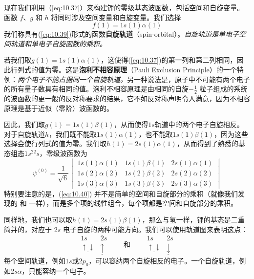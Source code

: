     现在我们利用（\ref{eq:10.37}）来构建锂的零级基态波函数，包括空间和自旋变量。函数 $f$、$g$ 和 $h$ 将同时涉及空间变量和自旋变量。我们选择
    \begin{equation}
        f\left(1\right) = 1s\left(1\right)\alpha\left(1\right)
        \label{eq:10.39}
    \end{equation}
    我们称具有(\ref{eq:10.39})形式的函数\textbf{自旋轨道}（spin-orbital）。\textit{自旋轨道是单电子空间轨道和单电子自旋函数的乘积。}

    若我们取$g\left(1\right) = 1s\left(1\right)\alpha\left(1\right)$，这使得(\ref{eq:10.37})的第一列和第二列相同，因此行列式的值为零。这是\textbf{泡利不相容原理}（Pauli Exclusion Principle）的一个特例：\textit{两个电子不能占据同一个自旋轨道。}另一种说法是，原子中不可能有两个电子的所有量子数具有相同的值。泡利不相容原理是由相同的自旋$-\frac{1}{2}$ 粒子组成的系统的波函数的更一般的反对称要求的结果，它不如反对称声明令人满意，因为不相容原理是基于近似（零阶）波函数的。

    因此，我们取$g\left(1\right) = 1s\left(1\right)\beta\left(1\right)$，从而使得$1s$轨道中的两个电子自旋相反。对于自旋轨道$h$，我们既不能取$1s\left(1\right)\alpha\left(1\right)$，也不能取$1s\left(1\right)\beta\left(1\right)$，因为这些选择会使行列式的值为零。我们取$h\left(1\right) = 2s\left(1\right)\alpha\left(1\right)$，从而得到了熟悉的基态组态$1s^22s$，零级波函数为
    \begin{equation}
        \psi^{\left(0\right)} = \frac{1}{\sqrt{6}}\begin{vmatrix}
            1s\left(1\right)\alpha\left(1\right) & 1s\left(1\right)\beta\left(1\right) & 2s\left(1\right)\alpha\left(1\right) \\
            1s\left(2\right)\alpha\left(2\right) & 1s\left(2\right)\beta\left(2\right) & 2s\left(2\right)\alpha\left(2\right) \\
            1s\left(3\right)\alpha\left(3\right) & 1s\left(3\right)\beta\left(3\right) & 2s\left(3\right)\alpha\left(3\right)
        \end{vmatrix}
        \label{eq:10.40}
    \end{equation}
    特别要注意的是，(\ref{eq:10.40}) 并不是简单的空间和自旋部分的乘积（就像我们发现的  和  一样），而是多个项的线性组合，每个项都是空间和自旋部分的乘积。

    同样地，我们也可以取$h\left(1\right) = 2s\left(1\right)\beta\left(1\right)$，那么与氢一样，锂的基态是二重简并的，对应于 $2s$ 电子自旋的两种可能方向。我们可以使用轨道图来表明这点：
    \begin{equation*}
        \begin{matrix}
            1s & 2s \\
            \underline{\uparrow \downarrow} & \underline{\uparrow}
        \end{matrix} \qquad \text{和} \qquad \begin{matrix}
            1s & 2s \\
            \underline{\uparrow \downarrow} & \underline{\downarrow}
        \end{matrix}
    \end{equation*}
    每个空间轨道，例如$1s$或$2p_0$，可以容纳两个自旋相反的电子。一个自旋轨道，例如$2s\alpha$，只能容纳一个电子。

